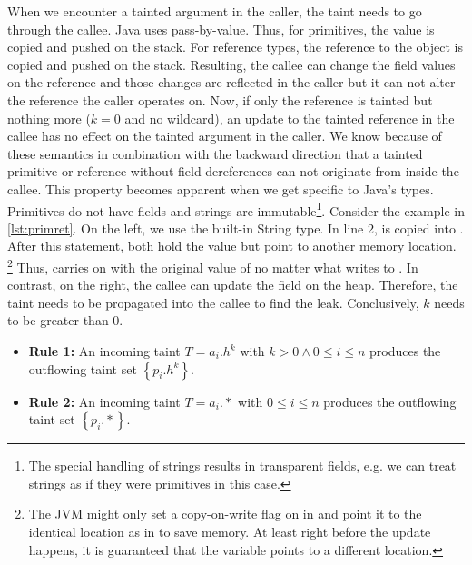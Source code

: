 \documentclass[../draft.tex]{subfiles}
\begin{document}
    When we encounter a tainted argument in the caller, the taint needs to go through the callee.
    Java uses pass-by-value\footnotemark{}.
    Thus, for primitives, the value is copied and pushed on the stack.
    For reference types, the reference to the object is copied and pushed on the stack.
    Resulting, the callee can change the field values on the reference and those changes are reflected in the caller but it can not alter the reference the caller operates on.
    Now, if only the reference is tainted but nothing more ($k=0$ and no wildcard), an update to the tainted reference in the callee has no effect on the tainted argument in the caller.
    We know because of these semantics in combination with the backward direction that a tainted primitive or reference without field dereferences can not originate from inside the callee.
    This property becomes apparent when we get specific to Java's types.
    Primitives do not have fields and strings are immutable\footnote{The special handling of strings results in transparent fields, e.g. we can treat strings as if they were primitives in this case.}.
    Consider the example in \autoref{lst:primret}.
    On the left, we use the built-in String type.
    In line 2,  is copied into .
    After this statement, both  hold the value  but point to another memory location\footnotemark{}.
    \footnote{%
        The JVM might only set a copy-on-write flag on  in  and point it to the identical location as  in  to save memory.
        At least right before the update happens, it is guaranteed that the variable points to a different location.
    }
    Thus,  carries on with the original value of  no matter what  writes to .
    In contrast, on the right, the callee can update the field on the heap.
    Therefore, the taint needs to be propagated into the callee to find the leak.
    Conclusively, $k$ needs to be greater than $0$.
    \begin{itemize}
        \item[] \textbf{Rule 1:} An incoming taint $T=a_i.h^k$ with $k > 0 \land 0 \leq i \leq n$ produces the outflowing taint set $\left\{p_i.h^k\right\}$.
        \item[] \textbf{Rule 2:} An incoming taint $T=a_i.*$ with $0 \leq i \leq n$ produces the outflowing taint set $\left\{p_i.*\right\}$.
    \end{itemize}
\end{document}
